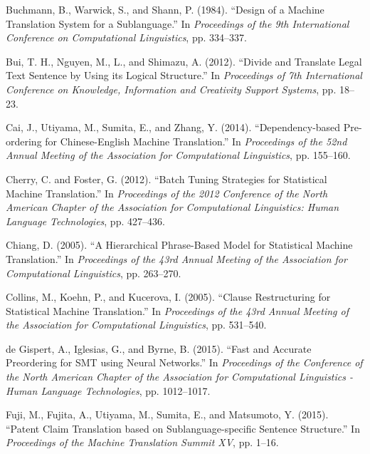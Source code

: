 \documentclass[japanese]{jnlp_1.4}
\begin{document}
\begin{thebibliography}{}

\item
Buchmann, B., Warwick, S., and Shann, P. (1984). ``Design of a Machine 
Translation System for a Sublanguage.'' In \textit{Proceedings of the 9th International Conference on Computational Linguistics}, pp. 334--337.

\item
Bui, T. H., Nguyen, M., L., and Shimazu, A. (2012). ``Divide and Translate 
Legal Text Sentence by Using its Logical Structure.'' In \textit{Proceedings of 7th International Conference on Knowledge, Information and Creativity Support Systems}, pp. 18--23.

\item
Cai, J., Utiyama, M., Sumita, E., and Zhang, Y. (2014). ``Dependency-based 
Pre-ordering for Chinese-English Machine Translation.'' In \textit{Proceedings of the 52nd Annual Meeting of the Association for Computational Linguistics}, pp. 155--160.

\item
Cherry, C. and Foster, G. (2012). ``Batch Tuning Strategies for Statistical 
Machine Translation.'' In \textit{Proceedings of the 2012 Conference of the North American Chapter of the Association for Computational Linguistics: Human Language Technologies}, pp. 427--436.

\item
Chiang, D. (2005). ``A Hierarchical Phrase-Based Model for Statistical 
Machine Translation.'' In \textit{Proceedings of the 43rd Annual Meeting of the Association for Computational Linguistics}, pp. 263--270.

\item
Collins, M., Koehn, P., and Kucerova, I. (2005). ``Clause Restructuring for 
Statistical Machine Translation.'' In \textit{Proceedings of the 43rd Annual Meeting of the Association for Computational Linguistics}, pp. 531--540.

\item
de Gispert, A., Iglesias, G., and Byrne, B. (2015). ``Fast and Accurate 
Preordering for SMT using Neural Networks.'' In \textit{Proceedings of the Conference of the North American Chapter of the Association for Computational Linguistics - Human Language Technologies}, pp. 1012--1017.

\item
Fuji, M., Fujita, A., Utiyama, M., Sumita, E., and Matsumoto, Y. (2015). 
``Patent Claim Translation based on Sublanguage-specific Sentence 
Structure.'' In \textit{Proceedings of the Machine Translation Summit XV}, pp. 1--16.


\end{thebibliography}
\end{document}
